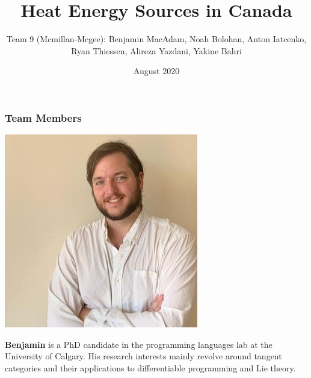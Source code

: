 \documentclass{beamer}
\title{Heat Energy Sources in Canada}
\author[Team 9 (Mcmillan-Mcgee)]
{Team 9 (Mcmillan-Mcgee): Benjamin MacAdam, Noah Bolohan, Anton Iatcenko, Ryan Thiessen, Alireza Yazdani, Yakine Bahri}
\institute[]{Math\textsuperscript{Industry}}
\date{August 2020}
\begin{document}
\frame{\titlepage}


\begin{frame}
\frametitle{Team Members}

\begin{minipage}[c]{0.15\textwidth}
\includegraphics[width=\textwidth, trim={25pt 0pt 0pt 0pt}, clip]{TeamPics/Ben.jpg}
\end{minipage}\hspace{0.05\textwidth}%
\begin{minipage}[c]{0.8\textwidth}
{\small \textbf{Benjamin} is a PhD candidate in the programming languages lab at the University of Calgary. His research interests mainly revolve around tangent categories and their applications to differentiable programming and Lie theory. }
\end{minipage}


\end{frame}
\end{document}
